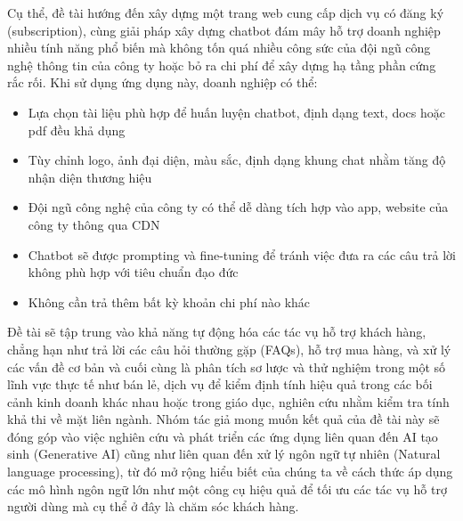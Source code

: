 Cụ thể, đề tài hướng đến xây dựng một trang web cung cấp dịch vụ có đăng ký (subscription), cùng giải pháp xây dựng chatbot đám mây hỗ trợ doanh nghiệp nhiều tính năng phổ biến mà không tốn quá nhiều công sức của đội ngũ công nghệ thông tin của công ty hoặc bỏ ra chi phí để xây dựng hạ tầng phần cứng rắc rối. Khi sử dụng ứng dụng này, doanh nghiệp có thể:

\begin{itemize}
    \item Lựa chọn tài liệu phù hợp để huấn luyện chatbot, định dạng text, docs hoặc pdf đều khả dụng
    \item Tùy chỉnh logo, ảnh đại diện, màu sắc, định dạng khung chat nhằm tăng độ nhận diện thương hiệu 
    \item Đội ngũ công nghệ của công ty có thể dễ dàng tích hợp vào app, website của công ty thông qua CDN
    \item Chatbot sẽ được prompting và fine-tuning để tránh việc đưa ra các câu trả lời không phù hợp với tiêu chuẩn đạo đức
    \item Không cần trả thêm bất kỳ khoản chi phí nào khác
\end{itemize}

Đề tài sẽ tập trung vào khả năng tự động hóa các tác vụ hỗ trợ khách hàng, chẳng hạn như trả lời các câu hỏi thường gặp (FAQs), hỗ trợ mua hàng, và xử lý các vấn đề cơ bản và cuối cùng là phân tích sơ lược và thử nghiệm trong một số lĩnh vực thực tế như bán lẻ, dịch vụ để kiểm định tính hiệu quả trong các bối cảnh kinh doanh khác nhau hoặc trong giáo dục, nghiên cứu nhằm kiểm tra tính khả thi về mặt liên ngành. Nhóm tác giả mong muốn kết quả của đề tài này sẽ đóng góp vào việc nghiên cứu và phát triển các ứng dụng liên quan đến AI tạo sinh (Generative AI) cũng như liên quan đến xử lý ngôn ngữ tự nhiên (Natural language processing), từ đó mở rộng hiểu biết của chúng ta về cách thức áp dụng các mô hình ngôn ngữ lớn như một công cụ hiệu quả để tối ưu các tác vụ hỗ trợ người dùng mà cụ thể ở đây là chăm sóc khách hàng.